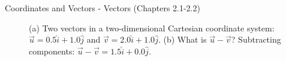 \documentclass{beamer}
\begin{document}
\begin{frame}{Coordinates and Vectors - Vectors (Chapters 2.1-2.2)}
\begin{figure}
\centering
{}
\caption{\label{fig:twovectors2} (a) Two vectors in a two-dimensional Cartesian coordinate system: $\vec{u} = 0.5\hat{i}+1.0\hat{j}$ and $\vec{v} = 2.0\hat{i}+1.0\hat{j}$.  (b) What is $\vec{u}-\vec{v}$?  Subtracting components: $\vec{u}-\vec{v} = 1.5\hat{i}+0.0\hat{j}$.}
\end{figure}
\end{frame}
\end{document}
